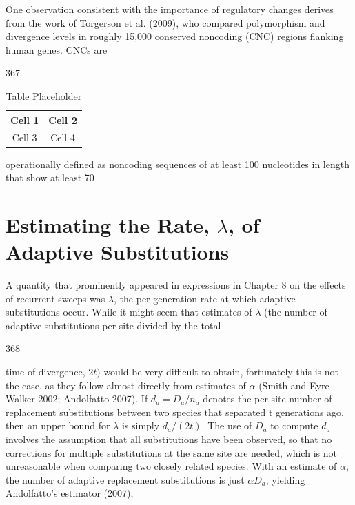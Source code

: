 \documentclass{article}
\begin{document}
One observation consistent with the importance of regulatory changes derives from the work of Torgerson et al. (2009), who compared polymorphism and divergence levels in roughly 15,000 conserved noncoding (CNC) regions flanking human genes. CNCs are

367

\begin{table}[h]
\centering
\begin{tabular}{|c|c|}
\hline
Cell 1 & Cell 2 \\
\hline
Cell 3 & Cell 4 \\
\hline
\end{tabular}
\caption{Table Placeholder}
\end{table}

operationally defined as noncoding sequences of at least 100 nucleotides in length that show at least 70%

\section{Estimating the Rate,  $ \lambda $, of Adaptive Substitutions}
A quantity that prominently appeared in expressions in Chapter 8 on the effects of recurrent sweeps was  $ \lambda $, the per-generation rate at which adaptive substitutions occur. While it might seem that estimates of  $ \lambda $ (the number of adaptive substitutions per site divided by the total

368

time of divergence,  $ 2t) $ would be very difficult to obtain, fortunately this is not the case, as they follow almost directly from estimates of  $ \alpha $ (Smith and Eyre-Walker 2002; Andolfatto 2007). If  $ d_{a} = D_{a}/n_{a} $ denotes the per-site number of replacement substitutions between two species that separated t generations ago, then an upper bound for  $ \lambda $ is simply  $ d_{a}/(2t) $. The use of  $ D_{a} $ to compute  $ d_{a} $ involves the assumption that all substitutions have been observed, so that no corrections for multiple substitutions at the same site are needed, which is not unreasonable when comparing two closely related species. With an estimate of  $ \alpha $, the number of adaptive replacement substitutions is just  $ \alpha D_{a} $, yielding Andolfatto's estimator (2007),
\end{document}
